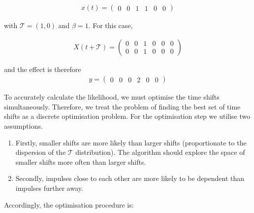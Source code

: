 \documentclass[11pt]{amsart}
\begin{document}
\begin{align*}
x(t) = 
\left(
\begin{array}{cccccc}
0 & 0 & 1 & 1 & 0 & 0
\end{array}  
\right)
\end{align*}

with $\mathcal{T}= (1, 0)$ and $\beta = 1$. For this case, 

\begin{align*}
X(t + \mathcal{T}) = 
\left(
\begin{array}{cccccc}
0 & 0 & 1 & 0 & 0 & 0 \\
0 & 0 & 1 & 0 & 0 & 0 
\end{array}  
\right)
\end{align*}

and the effect is therefore 
\begin{align*}
y = 
\left(
\begin{array}{cccccc}
0 & 0 & 0 & 2 & 0 & 0
\end{array}  
\right)
\end{align*}

To accurately calculate the likelihood, we must optimise the time shifts simultaneously. Therefore, we treat the problem of finding the best set of time shifts as a discrete optimisation problem. For the optimisation step we utilise two assumptions.
\begin{enumerate}
\item Firstly, smaller shifts are more likely than larger shifts (proportionate to the dispersion of the $\mathcal{T}$ distribution). The algorithm should explore the space of smaller shifts more often than larger shifts. 
\item Secondly, impulses close to each other are more likely to be dependent than impulses further away. 
\end{enumerate}


Accordingly, the optimisation procedure is:
\vspace{5mm} %
\end{document}
